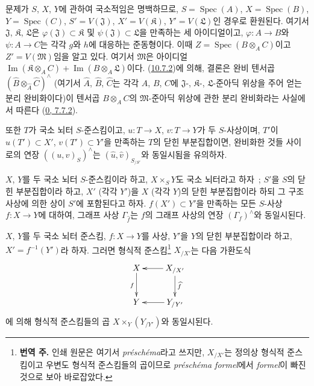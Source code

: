 문제가 $S$, $X$, $Y$에 관하여 국소적임은 명백하므로,
$S=\operatorname{Spec}(A)$,
$X=\operatorname{Spec}(B)$, $Y=\operatorname{Spec}(C)$,
$S'=V(\mathfrak{J})$, $X'=V(\mathfrak{K})$,
$Y'=V(\mathfrak{L})$인 경우로 환원된다. 여기서
$\mathfrak{J}$, $\mathfrak{K}$, $\mathfrak{L}$은
$\varphi(\mathfrak{J})\subset\mathfrak{K}$ 및
$\psi(\mathfrak{J})\subset\mathfrak{L}$을 만족하는 세 아이디얼이고,
$\varphi:A\to B$와 $\psi:A\to C$는 각각 $g$와 $h$에 대응하는
준동형이다. 이때 $Z=\operatorname{Spec}(B\otimes_A C)$이고
$Z'=V(\mathfrak{M})$임을 알고 있다. 여기서 $\mathfrak{M}$은
아이디얼
$\operatorname{Im}(\mathfrak{K}\otimes_A C)
+\operatorname{Im}(B\otimes_A\mathfrak{L})$이다.
(\hyperref[I.10.7.2-ko]{10.7.2})에 의해, 결론은 완비 텐서곱
$(\widehat B\otimes_{\widehat A}\widehat C)^\wedge$
(여기서 $\widehat A$, $\widehat B$, $\widehat C$는 각각
$A$, $B$, $C$에 $\mathfrak{J}$-, $\mathfrak{K}$-,
$\mathfrak{L}$-준아딕 위상을 주어 얻는 분리 완비화이다)이
텐서곱 $B\otimes_A C$의 $\mathfrak{M}$-준아딕 위상에 관한
분리 완비화라는 사실에서 따른다
(\hyperref[0.7.7.2-ko]{0, 7.7.2}).

또한 $T$가 국소 뇌터 $S$-준스킴이고,
$u:T\to X$, $v:T\to Y$가 두 $S$-사상이며, $T'$이
$u(T')\subset X'$, $v(T')\subset Y'$을 만족하는 $T$의 닫힌
부분집합이면, 완비화한 것들 사이로의 연장
$((u,v)_S)^\wedge$는
$(\widehat u,\widehat v)_{S_{/S'}}$와 동일시됨을 유의하자.

\begin{corollary}[10.9.8]
\label{I.10.9.8-ko}
$X$, $Y$를 두 국소 뇌터 $S$-준스킴이라 하고,
$X\times_S Y$도 국소 뇌터라고 하자~; $S'$을 $S$의 닫힌
부분집합이라 하고, $X'$ (각각 $Y'$)을 $X$ (각각 $Y$)의 닫힌
부분집합이라 하되 그 구조 사상에 의한 상이 $S'$에 포함된다고 하자.
$f(X')\subset Y'$을 만족하는 모든 $S$-사상 $f:X\to Y$에 대하여,
그래프 사상 $\Gamma_{\widehat f}$는 $f$의 그래프 사상의 연장
$(\Gamma_f)^\wedge$와 동일시된다.
\end{corollary}

\begin{corollary}[10.9.9]
\label{I.10.9.9-ko}
$X$, $Y$를 두 국소 뇌터 준스킴, $f:X\to Y$를 사상,
$Y'$을 $Y$의 닫힌 부분집합이라 하고, $X'=f^{-1}(Y')$라 하자.
그러면 형식적 준스킴\footnote{\textbf{번역 주.} 인쇄 원문은 여기서
\emph{préschéma}라고 쓰지만, $X_{/X'}$는 정의상 형식적 준스킴이고
우변도 형식적 준스킴들의 곱이므로 \emph{préschéma formel}에서
\emph{formel}이 빠진 것으로 보아 바로잡았다.} $X_{/X'}$는 다음 가환도식
\[
  \label{I.10.9.9.1-ko}
  \xymatrix{
    X\ar[d]_f &
    X_{/X'}\ar[l]\ar[d]^{\widehat f}\\
    Y &
    Y_{/Y'}\ar[l]
  }
\]
에 의해 형식적 준스킴들의 곱
$X\times_Y(Y_{/Y'})$와 동일시된다.
\end{corollary}


